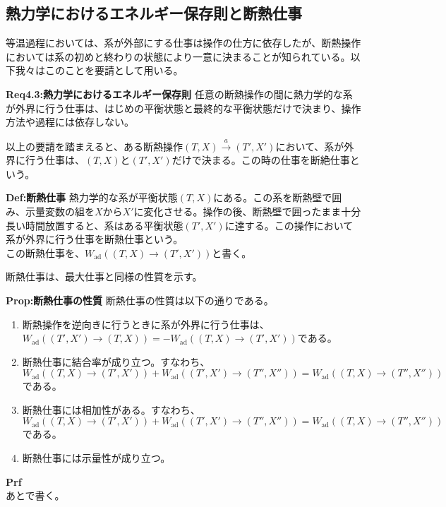 \documentclass[a4paper,11pt]{jsarticle}
\begin{document}
\subsection{熱力学におけるエネルギー保存則と断熱仕事}
等温過程においては、系が外部にする仕事は操作の仕方に依存したが、断熱操作においては系の初めと終わりの状態により一意に決まることが知られている。以下我々はこのことを要請として用いる。\\
\begin{itembox}[l]{\textbf{Req4.3:熱力学におけるエネルギー保存則}}
    任意の断熱操作の間に熱力学的な系が外界に行う仕事は、はじめの平衡状態と最終的な平衡状態だけで決まり、操作方法や過程には依存しない。
\end{itembox}
以上の要請を踏まえると、ある断熱操作$(T,X) \xrightarrow{a} (T',X')$において、系が外界に行う仕事は、$(T,X)$と$(T',X')$だけで決まる。この時の仕事を断絶仕事という。\\
\begin{itembox}[l]{\textbf{Def:断熱仕事}}
    熱力学的な系が平衡状態$(T,X)$にある。この系を断熱壁で囲み、示量変数の組を$X$から$X'$に変化させる。操作の後、断熱壁で囲ったまま十分長い時間放置すると、系はある平衡状態$(T',X')$に達する。この操作において系が外界に行う仕事を断熱仕事という。\\
    この断熱仕事を、$W_{\text{ad}}((T,X)\rightarrow (T',X'))$と書く。
\end{itembox}
断熱仕事は、最大仕事と同様の性質を示す。\\
\begin{itembox}[l]{\textbf{Prop:断熱仕事の性質}}
    断熱仕事の性質は以下の通りである。
    \begin{enumerate}
        \item 断熱操作を逆向きに行うときに系が外界に行う仕事は、$W_{\text{ad}}((T',X')\rightarrow (T,X)) = -W_{\text{ad}}((T,X)\rightarrow (T',X'))$である。
        \item 断熱仕事に結合率が成り立つ。すなわち、$W_{\text{ad}}((T,X)\rightarrow (T',X'))+W_{\text{ad}}((T',X')\rightarrow (T'',X'')) = W_{\text{ad}}((T,X)\rightarrow (T'',X''))$である。
        \item 断熱仕事には相加性がある。すなわち、$W_{\text{ad}}((T,X)\rightarrow (T',X'))+W_{\text{ad}}((T',X')\rightarrow (T'',X'')) = W_{\text{ad}}((T,X)\rightarrow (T'',X''))$である。
        \item 断熱仕事には示量性が成り立つ。
    \end{enumerate} 
\end{itembox}
\textbf{Prf}\\
あとで書く。\\
\end{document}
